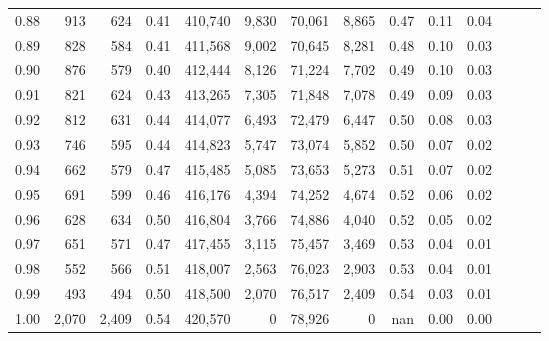 \begin{tabular}{rrrrrrrrrrrrrr}
0.88 &     913 &    624 &  0.41 &  410,740 &    9,830 &  70,061 &   8,865 &  0.47 &  0.11 &      0.04 \\
0.89 &     828 &    584 &  0.41 &  411,568 &    9,002 &  70,645 &   8,281 &  0.48 &  0.10 &      0.03 \\
0.90 &     876 &    579 &  0.40 &  412,444 &    8,126 &  71,224 &   7,702 &  0.49 &  0.10 &      0.03 \\
0.91 &     821 &    624 &  0.43 &  413,265 &    7,305 &  71,848 &   7,078 &  0.49 &  0.09 &      0.03 \\
0.92 &     812 &    631 &  0.44 &  414,077 &    6,493 &  72,479 &   6,447 &  0.50 &  0.08 &      0.03 \\
0.93 &     746 &    595 &  0.44 &  414,823 &    5,747 &  73,074 &   5,852 &  0.50 &  0.07 &      0.02 \\
0.94 &     662 &    579 &  0.47 &  415,485 &    5,085 &  73,653 &   5,273 &  0.51 &  0.07 &      0.02 \\
0.95 &     691 &    599 &  0.46 &  416,176 &    4,394 &  74,252 &   4,674 &  0.52 &  0.06 &      0.02 \\
0.96 &     628 &    634 &  0.50 &  416,804 &    3,766 &  74,886 &   4,040 &  0.52 &  0.05 &      0.02 \\
0.97 &     651 &    571 &  0.47 &  417,455 &    3,115 &  75,457 &   3,469 &  0.53 &  0.04 &      0.01 \\
0.98 &     552 &    566 &  0.51 &  418,007 &    2,563 &  76,023 &   2,903 &  0.53 &  0.04 &      0.01 \\
0.99 &     493 &    494 &  0.50 &  418,500 &    2,070 &  76,517 &   2,409 &  0.54 &  0.03 &      0.01 \\
1.00 &   2,070 &  2,409 &  0.54 &  420,570 &        0 &  78,926 &       0 &   nan &  0.00 &      0.00 \\
\bottomrule
\end{tabular}
